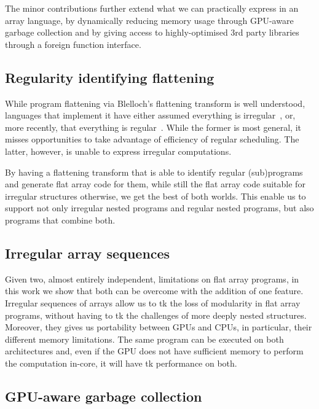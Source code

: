 The minor contributions further extend what we can practically express in an array language, by dynamically reducing memory usage through GPU-aware garbage collection and by giving access to highly-optimised 3rd party libraries through a foreign function interface.

\subsection{Regularity identifying flattening}

While program flattening via Blelloch's flattening transform is well understood, languages that implement it have either assumed everything is irregular~\cite{Blelloch:nesl1995,bergstrom:ndp2gpu,Chakravarty:DPH,Fluet:2007:manticore,proteus-frontiers95}, or, more recently, that everything is regular~\cite{Henriksen:2017futhark}. While the former is most general, it misses opportunities to take advantage of efficiency of regular scheduling. The latter, however, is unable to express irregular computations.

By having a flattening transform that is able to identify regular (sub)programs and generate flat array code for them, while still the flat array code suitable for irregular structures otherwise, we get the best of both worlds. This enable us to support not only irregular nested programs and regular nested programs, but also programs that combine both.

\subsection{Irregular array sequences}

Given two, almost entirely independent, limitations on flat array programs, in this work we show that both can be overcome with the addition of one feature. Irregular sequences of arrays allow us to tk the loss of modularity in flat array programs, without having to tk the challenges of more deeply nested structures. Moreover, they gives us portability between GPUs and CPUs, in particular, their different memory limitations. The same program can be executed on both architectures and, even if the GPU does not have sufficient memory to perform the computation in-core, it will have tk performance on both.

\subsection{GPU-aware garbage collection}

